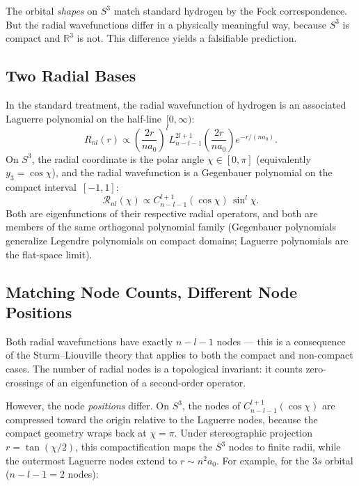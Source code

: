 \documentclass[12pt, a4paper]{article}
\theoremstyle{definition}
\theoremstyle{remark}
\newcommand{\Sthree}{S^3}
\newcommand{\R}{\mathbb{R}}
\begin{document}
The orbital \emph{shapes} on $\Sthree$ match standard hydrogen by the Fock
correspondence. But the radial wavefunctions differ in a physically
meaningful way, because $\Sthree$ is compact and $\R^3$ is not. This
difference yields a falsifiable prediction.

\subsection{Two Radial Bases}

In the standard treatment, the radial wavefunction of hydrogen is an
associated Laguerre polynomial on the half-line~$[0,\infty)$:
\begin{equation}
  R_{nl}(r) \propto \left(\frac{2r}{na_0}\right)^{\!l}
  L_{n-l-1}^{2l+1}\!\left(\frac{2r}{na_0}\right)
  e^{-r/(na_0)}.
  \label{eq:laguerre_radial}
\end{equation}
On $\Sthree$, the radial coordinate is the polar angle
$\chi \in [0, \pi]$ (equivalently $y_3 = \cos\chi$), and the radial
wavefunction is a Gegenbauer polynomial on the compact interval~$[-1, 1]$:
\begin{equation}
  \mathcal{R}_{nl}(\chi) \propto
  C_{n-l-1}^{l+1}(\cos\chi)\,\sin^l\!\chi.
  \label{eq:gegenbauer_radial}
\end{equation}
Both are eigenfunctions of their respective radial operators, and both are
members of the same orthogonal polynomial family (Gegenbauer polynomials
generalize Legendre polynomials on compact domains; Laguerre polynomials
are the flat-space limit).

\subsection{Matching Node Counts, Different Node Positions}

Both radial wavefunctions have exactly $n{-}l{-}1$ nodes --- this is a
consequence of the Sturm--Liouville theory that applies to both the compact
and non-compact cases. The number of radial nodes is a topological invariant:
it counts zero-crossings of an eigenfunction of a second-order operator.

However, the node \emph{positions} differ. On $\Sthree$, the nodes of
$C_{n-l-1}^{l+1}(\cos\chi)$ are compressed toward the origin relative to
the Laguerre nodes, because the compact geometry wraps back at
$\chi = \pi$. Under stereographic projection
$r = \tan(\chi/2)$, this compactification maps the $\Sthree$ nodes to
finite radii, while the outermost Laguerre nodes extend to
$r \sim n^2 a_0$. For example, for the $3s$ orbital ($n{-}l{-}1 = 2$
nodes):
\end{document}
